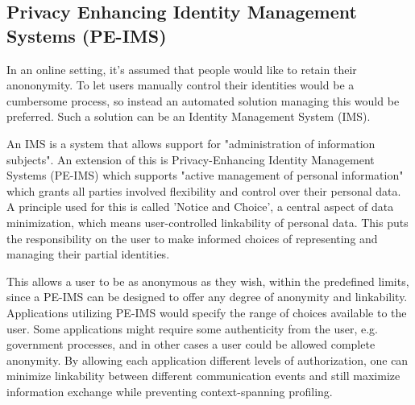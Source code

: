 
\subsection{Privacy Enhancing Identity Management Systems (PE-IMS)}


In an online setting, it's assumed that people would like to retain their anononymity.\cite{hansen2004privacy} To let users manually control their identities would be a cumbersome process, so instead an automated solution managing this would be preferred. Such a solution can be an Identity Management System (IMS).

An IMS is a system that allows support for "administration of information subjects". An extension of this is Privacy-Enhancing Identity Management Systems (PE-IMS) which supports "active management of personal information" which grants all parties involved flexibility and control over their personal data. A principle used for this is called 'Notice and Choice', a central aspect of data minimization, which means user-controlled linkability of personal data. This puts the responsibility on the user to make informed choices of representing and managing their partial identities.

This allows a user to be as anonymous as they wish, within the predefined limits, since a PE-IMS can be designed to offer any degree of anonymity and linkability. Applications utilizing PE-IMS would specify the range of choices available to the user. Some applications might require some authenticity from the user, e.g. government processes, and in other cases a user could be allowed complete anonymity. By allowing each application different levels of authorization, one can minimize linkability between different communication events and still maximize information exchange while preventing context-spanning profiling. %


